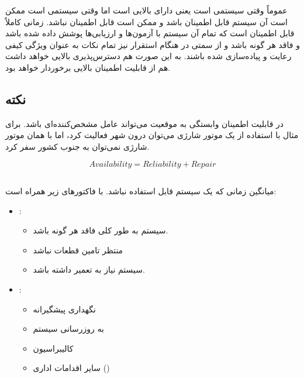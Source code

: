 عموماً وقتی سیستمی  است یعنی دارای  بالایی است اما
وقتی سیستمی  است ممکن است آن سیستم قابل اطمینان باشد و ممکن است
قابل اطمینان نباشد. زمانی کاملاً قابل اطمینان است که تمام آن سیستم با آزمون‌ها و
ارزیابی‌ها پوشش داده شده باشد و فاقد هر گونه  باشد و از سمتی در هنگام
استقرار نیز تمام نکات  به عنوان ویژگی کیفی رعایت و پیاده‌سازی
شده باشند. به این صورت هم دسترس‌پذیری بالایی خواهد داشت هم از قابلیت اطمینان
بالایی برخوردار خواهد بود.

\subsection*{نکته}

در قابلیت اطمینان وابستگی به موقعیت می‌تواند عامل مشخص‌کننده‌ای باشد. برای مثال
با استفاده از یک موتور شارژی می‌توان درون شهر فعالیت کرد، اما با همان موتور
شارژی نمی‌توان به جنوب کشور سفر کرد.

\begin{equation}
    Availability = Reliability + Repair
\end{equation}

\subsection{}

میانگین زمانی که یک سیستم قابل استفاده نباشد.  با فاکتور‌های زیر همراه
است:

\begin{itemize}
    \item {}:
    \begin{itemize}
        \item سیستم به طور کلی فاقد هر گونه  باشد.
        \item منتظر تامین قطعات نباشد
        \item سیستم نیاز به تعمیر داشته باشد.
    \end{itemize}
    \item {}:
    \begin{itemize}
        \item نگهداری پیشگیرانه
        \item به روزرسانی سیستم
        \item کالیبراسیون
        \item سایر اقدامات اداری ()
    \end{itemize}
\end{itemize}

